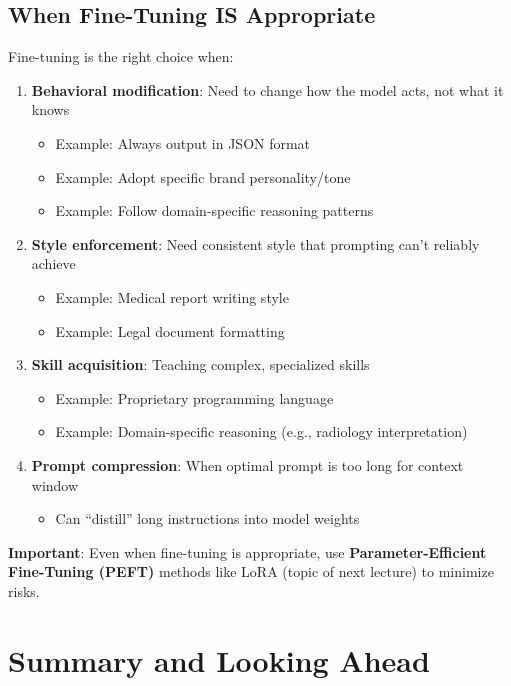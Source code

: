 \documentclass{article}
\begin{document}
\subsection{When Fine-Tuning IS Appropriate}

Fine-tuning is the right choice when:

\begin{enumerate}
\item \textbf{Behavioral modification}: Need to change how the model acts, not what it knows
\begin{itemize}
\item Example: Always output in JSON format
\item Example: Adopt specific brand personality/tone
\item Example: Follow domain-specific reasoning patterns
\end{itemize}

\item \textbf{Style enforcement}: Need consistent style that prompting can't reliably achieve
\begin{itemize}
\item Example: Medical report writing style
\item Example: Legal document formatting
\end{itemize}

\item \textbf{Skill acquisition}: Teaching complex, specialized skills
\begin{itemize}
\item Example: Proprietary programming language
\item Example: Domain-specific reasoning (e.g., radiology interpretation)
\end{itemize}

\item \textbf{Prompt compression}: When optimal prompt is too long for context window
\begin{itemize}
\item Can ``distill'' long instructions into model weights
\end{itemize}
\end{enumerate}

\textbf{Important}: Even when fine-tuning is appropriate, use \textbf{Parameter-Efficient Fine-Tuning (PEFT)} methods like LoRA (topic of next lecture) to minimize risks.

\section{Summary and Looking Ahead}
\end{document}
